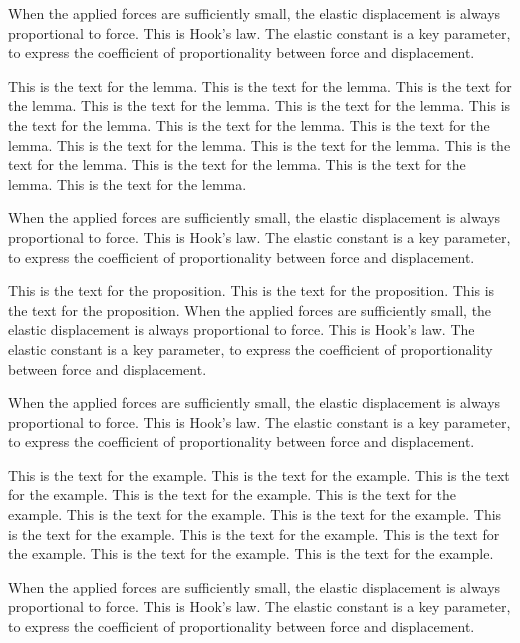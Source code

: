 When the applied forces are sufficiently small, the elastic 
displacement is always proportional to force. This is Hook's law. 
The elastic constant is a key parameter, to express the coefficient 
of proportionality between force and displacement.

\begin{lemma}  %
This is the text for the lemma.  This is the text for the lemma.  This
is the text for the lemma.  This is the text for the lemma. This is
the text for the lemma. This is the text for the lemma. This is the
text for the lemma. This is the text for the lemma. This is the text
for the lemma. This is the text for the lemma. This is the text for
the lemma. This is the text for the lemma. This is the text for the
lemma. This is the text for the lemma.
\end{lemma}

When the applied forces are sufficiently small, the elastic 
displacement is always proportional to force. This is Hook's law. 
The elastic constant is a key parameter, to express the coefficient 
of proportionality between force and displacement.

\begin{proposition}  %
This is the text for the proposition. This is the text for the
proposition. This is the text for the proposition.  When the applied
forces are sufficiently small, the elastic displacement is always
proportional to force. This is Hook's law.  The elastic constant is a
key parameter, to express the coefficient of proportionality between
force and displacement.
\end{proposition}

When the applied forces are sufficiently small, the elastic 
displacement is always proportional to force. This is Hook's law. 
The elastic constant is a key parameter, to express the coefficient 
of proportionality between force and displacement.

\begin{example}  %
This is the text for the example. This is the text for the
example. This is the text for the example. This is the text for the
example. This is the text for the example. This is the text for the
example. This is the text for the example. This is the text for the
example. This is the text for the example. This is the text for the
example. This is the text for the example. This is the text for the
example.
\end{example}

When the applied forces are sufficiently small, the elastic 
displacement is always proportional to force. This is Hook's law. 
The elastic constant is a key parameter, to express the coefficient 
of proportionality between force and displacement.

